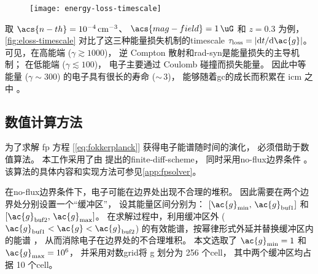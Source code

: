 \begin{figure}[htp]
  \centering
  \texttt{[image: energy-loss-timescale]}
  \label{fig:eloss-timescale}
\end{figure}

取 $\acs{n-th} = \SI{e-4}{\per\cubic\cm}$、
$\acs{mag-field} = \SI{1}{\uG}$ 和 $z = 0.3$ 为例，
\autoref{fig:eloss-timescale} 对比了这三种能量损失机制的\ac{timescale}
$\tau_{\R{loss}} = |\D{t}/\D{\ac{g}}|$。
可见，在高能端 ($\gamma \gtrsim 1000$)，
逆 Compton 散射和\ac{rad-syn}是能量损失的主导机制；
在低能端 ($\gamma \lesssim 100$)，
电子主要通过 Coulomb 碰撞而损失能量。
因此中等能量 ($\gamma \sim 300$) 的电子具有很长的寿命 ($\sim$\,\SI{3}{\Gyr})，
能够随着\ac{gc}的成长而积累在 \ac{icm} 之中 \cite{sarazin1999}。

\subsection{数值计算方法}
\label{sec:numerical}

为了求解 \ac{fp} 方程 [\autoref{eq:fokkerplanck}] 获得电子能谱随时间的演化，
必须借助于数值算法。
本工作采用了由  提出的\ac{finite-diff-scheme}，
同时采用\ac{no-flux}边界条件 \cite{park1996}。
该算法的具体内容和实现方法可参见\autoref{app:fpsolver}。

在\ac{no-flux}边界条件下，电子可能在边界处出现不合理的堆积。
因此需要在两个边界处分别设置一个\enquote{缓冲区}，
设其能量区间分别为：
$[\ac{g}_{\R{min}}, \,\ac{g}_{\R{buf1}}]$ 和
$[\ac{g}_{\R{buf2}}, \,\ac{g}_{\R{max}}]$。
在求解过程中，利用缓冲区外 ($\ac{g}_{\R{buf1}} < \ac{g} < \ac{g}_{\R{buf2}}$)
的有效能谱，按幂律形式外延并替换缓冲区内的能谱 \cite{borovsky1986,donnert2014}，
从而消除电子在边界处的不合理堆积。
本文选取了 $\ac{g}_{\R{min}} = 1$ 和 $\ac{g}_{\R{max}} = \num{e6}$，
并采用对数\ac{grid}将 \ac{g} 划分为 256 个\ac{cell}，
其中两个缓冲区均占据 10 个\ac{cell}。

